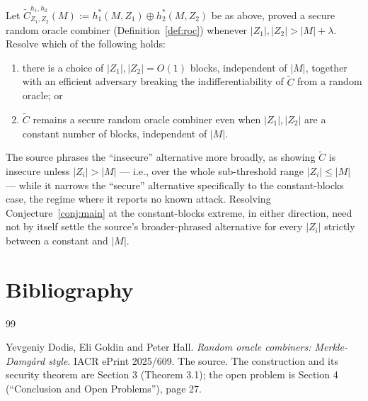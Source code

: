 \documentclass{aicr-conjecture}
\newcommand{\Z}{Z}
\newcommand{\Ctil}{\widetilde{C}}
\begin{document}
\begin{conjecture}[Security of $\Ctil$ under short salts]\label{conj:main}
Let $\Ctil^{h_{1},h_{2}}_{\Z_{1},\Z_{2}}(M) := h_{1}^{*}(M, \Z_{1})
\oplus h_{2}^{*}(M, \Z_{2})$ be as above, proved a secure random oracle
combiner (Definition~\ref{def:roc}) whenever $|\Z_{1}|, |\Z_{2}| > |M|
+ \lambda$. Resolve which of the following holds:
\begin{enumerate}[nosep,label=(\roman*)]
  \item there is a choice of $|\Z_{1}|, |\Z_{2}| = O(1)$ blocks,
    independent of $|M|$, together with an efficient adversary breaking
    the indifferentiability of $\Ctil$ from a random oracle; or
  \item $\Ctil$ remains a secure random oracle combiner even when
    $|\Z_{1}|, |\Z_{2}|$ are a constant number of blocks, independent
    of $|M|$.
\end{enumerate}
\end{conjecture}

\begin{remark}
The source phrases the ``insecure'' alternative more broadly, as
showing $\Ctil$ is insecure unless $|\Z_{i}| > |M|$ --- i.e., over the
whole sub-threshold range $|\Z_{i}| \le |M|$ --- while it narrows the
``secure'' alternative specifically to the constant-blocks case, the
regime where it reports no known attack. Resolving
Conjecture~\ref{conj:main} at the constant-blocks extreme, in either
direction, need not by itself settle the source's broader-phrased
alternative for every $|\Z_{i}|$ strictly between a constant and $|M|$.
\end{remark}

\section{Bibliography}

\begin{aicrbibliography}{99}

Yevgeniy Dodis, Eli Goldin and Peter Hall.
\emph{Random oracle combiners: Merkle-Damg\r{a}rd style}.
IACR ePrint 2025/609.
The source. The construction and its security theorem are Section 3
(Theorem 3.1); the open problem is Section 4 (``Conclusion and Open
Problems''), page 27.

\end{aicrbibliography}
\end{document}
